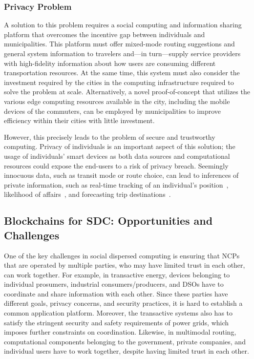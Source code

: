\documentclass[12pt,letterpaper]{article}
\begin{document}
\subsubsection{Privacy Problem}
A solution to this problem requires a social computing and information sharing platform that overcomes the incentive gap between individuals and municipalities. This platform must offer mixed-mode routing suggestions and general system information to travelers and---in turn---supply service providers with high-fidelity information about how users are consuming different transportation resources. At the same time, this system must also consider the investment required by the cities in the computing infrastructure required to solve the problem at scale. Alternatively, a novel proof-of-concept that utilizes the various edge computing resources available in the city, including the mobile devices of the commuters, can be employed by municipalities to improve efficiency within their cities with little investment.

However, this precisely leads to the problem of secure and trustworthy computing.  Privacy of individuals is an important aspect of this solution; the usage of individuals' smart devices as both data sources and computational resources  could expose the end-users to a risk of privacy breach. Seemingly innocuous data, such as transit mode or route choice, can lead to inferences of
private information, such as real-time tracking of an individual's position~\cite{koufogiannis:2015aa}, likelihood of affairs~\cite{mueffelmann:2015aa}, and forecasting trip destinations~\cite{dewri:2013aa}.

\subsection{Blockchains for SDC: Opportunities and Challenges}

One of the key challenges in social dispersed computing is ensuring that NCPs that are operated by multiple parties, who may have limited trust in each other, can work together.
For example, in transactive energy, devices belonging to individual prosumers, industrial consumers/producers, and DSOs have to coordinate and share information with each other.
Since these parties have different goals, privacy concerns, and security practices, it is hard to establish a common application platform.
Moreover, the transactive systems also has to satisfy the stringent security and safety requirements of power grids, which imposes further constraints on coordination.  
Likewise, in multimodal routing, computational components belonging to the government, private companies, and individual users have to work together, despite having limited trust in each other.
\end{document}
